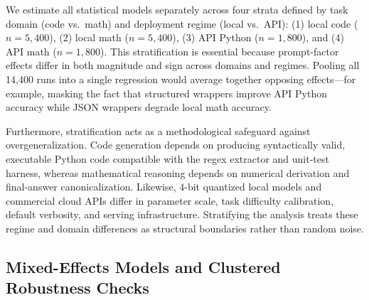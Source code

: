 \documentclass[a4paper,fleqn]{cas-sc}
\begin{document}
We estimate all statistical models separately across four strata defined by task domain (code vs.\ math) and deployment regime (local vs.\ API): (1) local code ($n = 5,400$), (2) local math ($n = 5,400$), (3) API Python ($n = 1,800$), and (4) API math ($n = 1,800$). This stratification is essential because prompt-factor effects differ in both magnitude and sign across domains and regimes. Pooling all 14,400 runs into a single regression would average together opposing effects—for example, masking the fact that structured wrappers improve API Python accuracy while JSON wrappers degrade local math accuracy.

Furthermore, stratification acts as a methodological safeguard against overgeneralization. Code generation depends on producing syntactically valid, executable Python code compatible with the regex extractor and unit-test harness, whereas mathematical reasoning depends on numerical derivation and final-answer canonicalization. Likewise, 4-bit quantized local models and commercial cloud APIs differ in parameter scale, task difficulty calibration, default verbosity, and serving infrastructure. Stratifying the analysis treats these regime and domain differences as structural boundaries rather than random noise.

\subsection{Mixed-Effects Models and Clustered Robustness Checks}\label{fixed-effect-and-mixed-effect-considerations}
\end{document}
